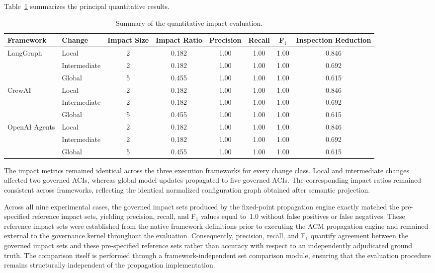 \documentclass[10pt]{article}
\begin{document}
Table~\ref{tab:impact_summary} summarizes the principal quantitative results.

\begin{table}[t]
	\centering
	\caption{Summary of the quantitative impact evaluation.}
	\label{tab:impact_summary}
	\small
	\begin{tabular}{llcccccc}
		\toprule
		Framework &
		Change &
		Impact Size &
		Impact Ratio &
		Precision &
		Recall &
		F$_1$ &
		Inspection Reduction
		\\
		\midrule
		LangGraph &
		Local &
		2 &
		0.182 &
		1.00 &
		1.00 &
		1.00 &
		0.846
		\\
		&
		Intermediate &
		2 &
		0.182 &
		1.00 &
		1.00 &
		1.00 &
		0.692
		\\
		&
		Global &
		5 &
		0.455 &
		1.00 &
		1.00 &
		1.00 &
		0.615
		\\
		\midrule
		CrewAI &
		Local &
		2 &
		0.182 &
		1.00 &
		1.00 &
		1.00 &
		0.846
		\\
		&
		Intermediate &
		2 &
		0.182 &
		1.00 &
		1.00 &
		1.00 &
		0.692
		\\
		&
		Global &
		5 &
		0.455 &
		1.00 &
		1.00 &
		1.00 &
		0.615
		\\
		\midrule
		OpenAI Agents &
		Local &
		2 &
		0.182 &
		1.00 &
		1.00 &
		1.00 &
		0.846
		\\
		&
		Intermediate &
		2 &
		0.182 &
		1.00 &
		1.00 &
		1.00 &
		0.692
		\\
		&
		Global &
		5 &
		0.455 &
		1.00 &
		1.00 &
		1.00 &
		0.615
		\\
		\bottomrule
	\end{tabular}
\end{table}

The impact metrics remained identical across the three execution frameworks for every change class. Local and intermediate changes affected two governed ACIs, whereas global model updates propagated to five governed ACIs. The corresponding impact ratios remained consistent across frameworks, reflecting the identical normalized configuration graph obtained after semantic projection. 

Across all nine experimental cases, the governed impact sets produced by the fixed-point propagation engine exactly matched the pre-specified reference impact sets, yielding precision, recall, and F$_1$ values equal to~1.0 without false positives or false negatives. These reference impact sets were established from the native framework definitions prior to executing the ACM propagation engine and remained external to the governance kernel throughout the evaluation. Consequently, precision, recall, and F$_1$ quantify agreement between the governed impact sets and these pre-specified reference sets rather than accuracy with respect to an independently adjudicated ground truth. The comparison itself is performed through a framework-independent set comparison module, ensuring that the evaluation procedure remains structurally independent of the propagation implementation.
\end{document}
